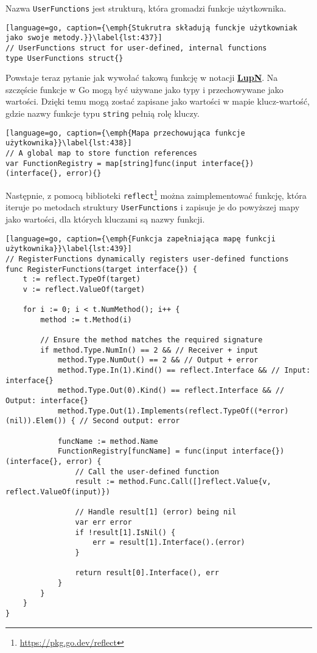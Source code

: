 Nazwa \texttt{UserFunctions} jest strukturą, która gromadzi funkcje użytkownika.

\begin{lstlisting}[language=go, caption={\emph{Stukrutra składują funckje użytkowniak jako swoje metody.}}\label{lst:437}]
// UserFunctions struct for user-defined, internal functions
type UserFunctions struct{}
\end{lstlisting}

Powstaje teraz pytanie jak wywołać takową funkcję w notacji \hyperlink{def:lupn}{\textbf{LupN}}. Na szczęście funkcje w Go mogą być używane jako typy i przechowywane jako wartości. Dzięki temu mogą zostać zapisane jako wartości w mapie klucz-wartość, gdzie nazwy funkcje typu \texttt{string} pełnią rolę kluczy.


\begin{lstlisting}[language=go, caption={\emph{Mapa przechowująca funkcje użytkownika}}\label{lst:438}]
// A global map to store function references
var FunctionRegistry = map[string]func(input interface{}) (interface{}, error){}
\end{lstlisting}

Następnie, z pomocą biblioteki \texttt{reflect}\footnote{\url{https://pkg.go.dev/reflect}} można zaimplementować funkcję, która iteruje po metodach struktury \texttt{UserFunctions} i zapisuje je do powyższej mapy jako wartości, dla których kluczami są nazwy funkcji. 

\begin{lstlisting}[language=go, caption={\emph{Funkcja zapełniająca mapę funkcji użytkownika}}\label{lst:439}]
// RegisterFunctions dynamically registers user-defined functions
func RegisterFunctions(target interface{}) {
	t := reflect.TypeOf(target)
	v := reflect.ValueOf(target)

	for i := 0; i < t.NumMethod(); i++ {
		method := t.Method(i)

		// Ensure the method matches the required signature
		if method.Type.NumIn() == 2 && // Receiver + input
			method.Type.NumOut() == 2 && // Output + error
			method.Type.In(1).Kind() == reflect.Interface && // Input: interface{}
			method.Type.Out(0).Kind() == reflect.Interface && // Output: interface{}
			method.Type.Out(1).Implements(reflect.TypeOf((*error)(nil)).Elem()) { // Second output: error

			funcName := method.Name
			FunctionRegistry[funcName] = func(input interface{}) (interface{}, error) {
				// Call the user-defined function
				result := method.Func.Call([]reflect.Value{v, reflect.ValueOf(input)})

				// Handle result[1] (error) being nil
				var err error
				if !result[1].IsNil() {
					err = result[1].Interface().(error)
				}

				return result[0].Interface(), err
			}
		}
	}
}
\end{lstlisting}

